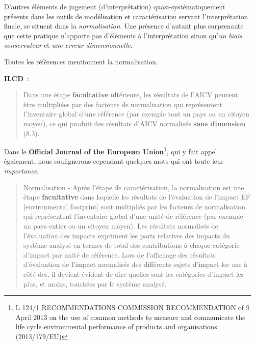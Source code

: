 D'autres éléments de jugement (d'interprétation) quasi-systématiquement présents dans les outils de modélisation et caractérisation servant l'interprétation finale, se situent dans la \emph{normalisation}.
Une présence d'autant plus surprenante que cette pratique n'apporte pas d'éléments à l'interprétation sinon qu'\emph{un biais conservateur}
et \emph{une erreur dimensionnelle}.

Toutes les références mentionnent la normalisation.
\begin{description}
\item \textbf{ILCD}~:
\blockcquote[traduction, p 275. 8.1 Introduction and overview (Refers to aspects of ISO 14044:2006 chapter 4.4.1, 4.4.2, and 4.4.3)]{european_commission_ilcd_2010}{
Dans une étape \textbf{facultative} ultérieure, les résultats de l'AICV peuvent être multipliées par des facteurs de normalisation qui représentent l'inventaire global d'une référence (par exemple tout un pays ou un citoyen moyen), ce qui produit des résultats d'AICV normalisés \textbf{sans dimension} (8.3).
}
\item Dans le \textbf{Official Journal of the European Union}\footnote{L 124/1
RECOMMENDATIONS COMMISSION RECOMMENDATION of 9 April 2013 on the use of common methods to measure and communicate the life cycle environmental performance of products and organisations (2013/179/EU)}, qui y fait appel également,
nous soulignerons cependant quelques mots qui ont toute leur \emph{importance}.
\blockcquote[traduction]{commission_europeenne_commission_2013}{
Normalisation - Après l'étape de caractérisation, la normalisation est une étape \textbf{facultative} dans laquelle les résultats de l'évaluation de l'impact EF [environmental footprint] sont multipliés par les facteurs de normalisation qui représentent l'inventaire global d'une unité de référence (par exemple un pays entier ou un citoyen moyen).
Les résultats normalisés de l'évaluation des impacts expriment les parts relatives des impacts du système analysé en termes de total des contributions à chaque catégorie d'impact par unité de référence.
Lors de l'affichage des résultats d'évaluation de l'impact normalisés des différents sujets d'impact les uns à côté des, il devient évident de dire quelles sont les catégories d'impact les plus, et moins, touchées par le système analysé.
}
\end{description}
